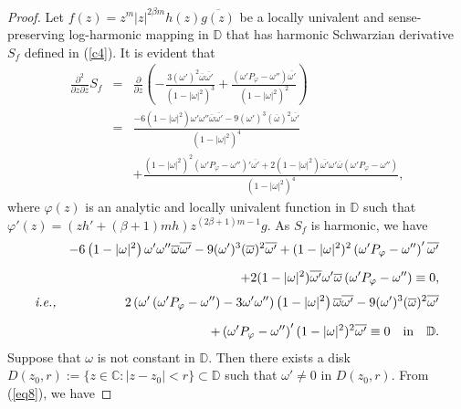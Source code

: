 \documentclass[12pt,reqno]{amsart}
\newtheorem{open problem}{Open problem}[section]
\newcommand{\ol}{\overline}
\newcommand{\beas}{\begin{eqnarray*}}
\newcommand{\eeas}{\end{eqnarray*}}
\newcommand{\bea}{\begin{eqnarray}}
\newcommand{\eea}{\end{eqnarray}}
\renewcommand{\phi}{\varphi}
\numberwithin{equation}{section}
\begin{document}
\begin{proof} 
Let $f(z)=z^m|z|^{2\beta m} h(z)\ol{g(z)}$ be a locally univalent and sense-preserving log-harmonic mapping in $\mathbb{D}$ that has harmonic Schwarzian derivative $S_f$ defined in (\ref{c4}). It is evident that 
\beas\frac{\partial^2 }{\partial z\partial \ol{z}}S_f&=&\frac{\partial }{\partial z}\left(-\frac{3(\omega')^2\ol{\omega}\ol{\omega'}}{(1-|\omega|^2)^3}+\frac{\left(\omega' P_\phi-\omega''\right)\ol{\omega' }}{(1-|\omega|^2)^2}\right)\\[1mm]
&=&\frac{-6\left(1-|\omega|^2\right)\omega'\omega''\ol{\omega}\ol{\omega'}-9(\omega')^3(\ol{\omega})^2\ol{\omega'}}{(1-|\omega|^2)^4}\\[2mm]
&&+\frac{(1-|\omega|^2)^2\left(\omega' P_\phi-\omega''\right)'\ol{\omega' }+2(1-|\omega|^2)\ol{\omega' }\omega'\ol{\omega}\left(\omega' P_\phi-\omega''\right)}{(1-|\omega|^2)^4},\eeas
where $\phi(z)$ is an analytic and locally univalent function in $\mathbb{D}$ such that $\phi'(z)=(zh'+(\beta+1)m h)z^{(2\beta+1)m-1}g$.
As $S_f$ is harmonic, we have 
\bea&& -6\left(1-|\omega|^2\right)\omega'\omega''\ol{\omega}\ol{\omega'}-9(\omega')^3(\ol{\omega})^2\ol{\omega'}+(1-|\omega|^2)^2\left(\omega' P_\phi-\omega''\right)'\ol{\omega' }\nonumber\\[2mm]
&&+2(1-|\omega|^2)\ol{\omega' }\omega'\ol{\omega}\left(\omega' P_\phi-\omega''\right)\equiv 0,\nonumber\\[1mm]\text{\it i.e.,}
&&2\left(\omega'\left(\omega' P_\phi-\omega''\right)-3\omega'\omega''\right)\left(1-|\omega|^2\right)\ol{\omega}\ol{\omega'}-9(\omega')^3(\ol{\omega})^2\ol{\omega'}\nonumber\\[2mm]
\label{eq8}&&+\left(\omega' P_\phi-\omega''\right)'(1-|\omega|^2)^2\ol{\omega' }\equiv 0\quad\text{in}\quad\mathbb{D}.\eea
Suppose that $\omega$ is not constant in $\mathbb{D}$. Then there exists a disk $D(z_0, r):=\{z\in\mathbb{C}: |z-z_0|<r\}\subset \mathbb{D}$ such that $\omega'\not=0$ in $D(z_0, r)$. From (\ref{eq8}), we have 

\end{proof}
\end{document}
